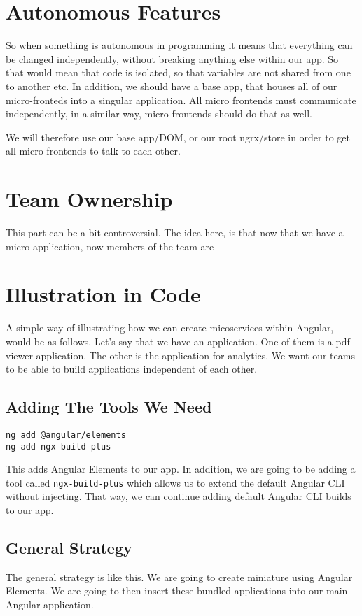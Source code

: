 \section{Autonomous Features}
So when something is autonomous in programming it means that everything can be changed independently, without breaking anything else within our app. So that would mean that code is isolated, so that variables are not shared from one to another etc. In addition, we should have a base app, that houses all of our micro-fronteds into a singular application. All micro frontends must communicate independently, in a similar way, micro frontends should do that as well. 

We will therefore use our base app/DOM, or our root ngrx/store in order to get all micro frontends to talk to each other. 

\section{Team Ownership}
This part can be a bit controversial. The idea here, is that now that we have a micro application, now members of the team are 

\section{Illustration in Code}
A simple way of illustrating how we can create micoservices within Angular, would be as follows. Let's say that we have an application. One of them is a pdf viewer application. The other is the application for analytics. We want our teams to be able to build applications independent of each other. 

\subsection{Adding The Tools We Need}
\begin{verbatim}
ng add @angular/elements
ng add ngx-build-plus
\end{verbatim}

This adds Angular Elements to our app. In addition, we are going to be adding a tool called \lstinline{ngx-build-plus} which allows us to extend the default Angular CLI without injecting. That way, we can continue adding default Angular CLI builds to our app. 

\subsection{General Strategy}
The general strategy is like this. We are going to create miniature using Angular Elements. We are going to then insert these bundled applications into our main Angular application. 

